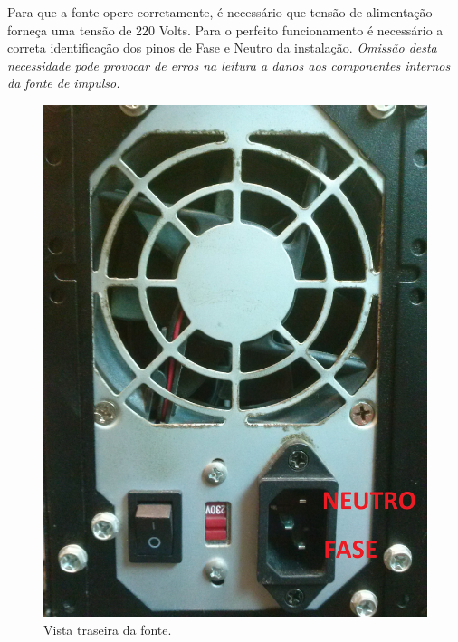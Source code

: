 \documentclass[a4paper, 10pt]{article}
\begin{document}

Para que a fonte opere corretamente, é necessário que tensão de alimentação 
forneça uma tensão de 220 Volts. Para o perfeito funcionamento é necessário a correta 
identificação dos pinos de Fase e Neutro da instalação. \textit{Omissão desta necessidade 
pode provocar de erros na leitura a danos aos componentes internos da fonte de impulso.}

\begin{figure}[!h]
        \caption{\label{fig_vista_traseira_fonte} Vista traseira da fonte.}
	    \begin{center}
            \includegraphics[scale=0.08]{../fotos/fonte_alimentacao.jpg}
	    \end{center}
\end{figure}
\end{document}
